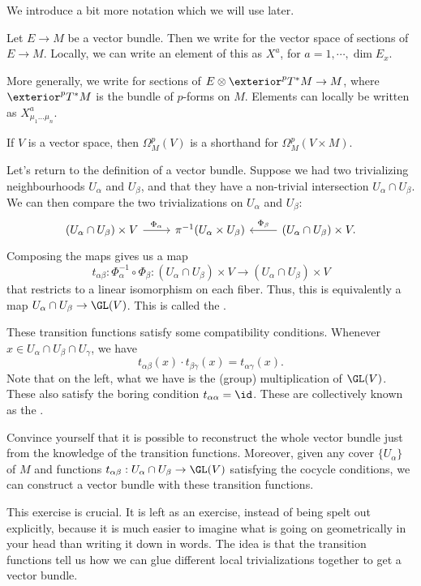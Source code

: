 \documentclass[a4paper]{article}
\begin{document}
We introduce a bit more notation which we will use later.

\begin{notation}
  Let $E \to M$ be a vector bundle. Then we write  for the vector space of sections of $E \to M$. Locally, we can write an element of this as $X^a$, for $a = 1, \cdots, \dim E_x$.

  More generally, we write  for sections of $E \otimes \exterior^pT^*M \to M$, where $\exterior^p T^*M$ is the bundle of $p$-forms on $M$. Elements can locally be written as $X^a_{\mu_1 \ldots \mu_n}$.

  If $V$ is a vector space, then $\Omega^p_M(V)$ is a shorthand for $\Omega^p_M(V \times M)$. %
\end{notation}

Let's return to the definition of a vector bundle. Suppose we had two trivializing neighbourhoods $U_\alpha$ and $U_\beta$, and that they have a non-trivial intersection $U_\alpha \cap U_\beta$. We can then compare the two trivializations on $U_\alpha$ and $U_\beta$:
\[
  \begin{tikzcd}
    (U_\alpha \cap U_\beta) \times V \ar[r, "\Phi_\alpha"] & \pi^{-1}(U_\alpha \times U_\beta) & (U_\alpha \cap U_\beta) \times V \ar[l, "\Phi_\beta"'].
  \end{tikzcd}
\]
Composing the maps gives us a map
\[
  t_{\alpha\beta} : \Phi_\alpha^{-1} \circ \Phi_\beta: (U_\alpha \cap U_\beta) \times V \to (U_\alpha \cap U_\beta) \times V
\]
that restricts to a linear isomorphism on each fiber. Thus, this is equivalently a map $U_\alpha \cap U_\beta \to \GL(V)$. This is called the .

These transition functions satisfy some compatibility conditions. Whenever $x \in U_\alpha \cap U_\beta \cap U_\gamma$, we have
\[
  t_{\alpha\beta}(x) \cdot t_{\beta\gamma}(x) = t_{\alpha\gamma}(x).
\]
Note that on the left, what we have is the (group) multiplication of $\GL(V)$. These also satisfy the boring condition $t_{\alpha\alpha} = \id$. These are collectively known as the .

\begin{ex}
  Convince yourself that it is possible to reconstruct the whole vector bundle just from the knowledge of the transition functions. Moreover, given any cover $\{U_\alpha\}$ of $M$ and functions $t_{\alpha\beta}: U_\alpha \cap U_\beta \to \GL(V)$ satisfying the cocycle conditions, we can construct a vector bundle with these transition functions.
\end{ex}
This exercise is crucial. It is left as an exercise, instead of being spelt out explicitly, because it is much easier to imagine what is going on geometrically in your head than writing it down in words. The idea is that the transition functions tell us how we can glue different local trivializations together to get a vector bundle.
\end{document}
